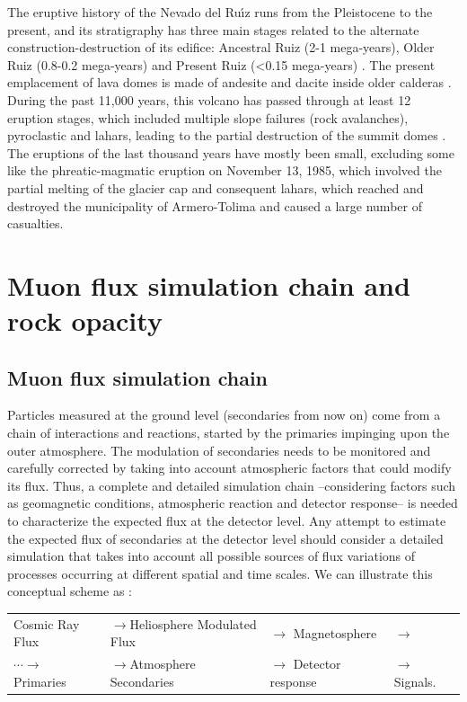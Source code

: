 \documentclass[letterpaper,10pt,titlepage,linenumber]{article}
\begin{document}
The eruptive history of the Nevado del Ru\'{\i}z  runs from the Pleistocene to the present, and its stratigraphy has three main stages related to the alternate construction-destruction of its edifice: Ancestral Ruiz (2-1 mega-years), Older Ruiz (0.8-0.2 mega-years) and Present Ruiz (<0.15 mega-years) \cite{ThouretEtal1990}. The present emplacement of lava domes is made of andesite and dacite inside older calderas \cite{HuggelEtal2007}. During the past 11,000 years, this volcano has passed through at least 12 eruption stages, which included multiple slope failures (rock avalanches), pyroclastic and lahars, leading to the partial destruction of the summit domes \cite{ThouretEtal1990, HuggelEtal2007}. The eruptions of the last thousand years have mostly been small, excluding some like the phreatic-magmatic eruption on November 13, 1985, which involved the partial melting of the glacier cap and consequent lahars, which reached and destroyed the municipality of Armero-Tolima and caused a large number of casualties.


\section{Muon flux simulation chain and rock opacity}
\label{SimulationMuonFlux}

\subsection{Muon flux simulation chain}
\label{SimulationChain} 
Particles measured at the ground level (secondaries from now on) come from a chain of interactions and reactions, started by the primaries impinging upon the outer atmosphere. The modulation of secondaries needs to be monitored and carefully corrected by taking into account atmospheric factors that could modify its flux. Thus, a complete and detailed simulation chain --considering factors such as geomagnetic conditions, atmospheric reaction and detector response-- is needed to characterize the expected flux at the detector level.  Any attempt to estimate the expected flux of secondaries at the detector level should consider a detailed simulation that takes into account all possible sources of flux variations of processes occurring at different spatial and time scales. We can illustrate this conceptual scheme as \cite{AsoreyEtal2015B, SuarezENG2015, AsoreyNunezSuarez2018}:
\begin{center}
    \begin{tabular}{llll}
        Cosmic Ray Flux & $\rightarrow$Heliosphere Modulated Flux & $\rightarrow$ Magnetosphere &  $\rightarrow$ \\
        $\cdots \rightarrow$ Primaries & $\rightarrow$Atmosphere Secondaries & $\rightarrow$ Detector response &$\rightarrow$ Signals.
    \end{tabular}
\end{center}
\end{document}
